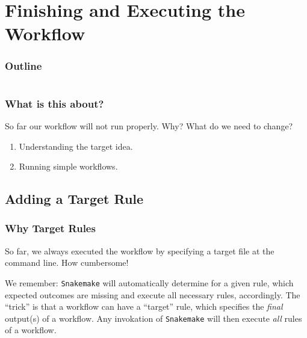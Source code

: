 \section{Finishing and Executing the Workflow}

\begin{frame}
    \frametitle{Outline}
    \begin{columns}[t]
        \begin{column}{.5\textwidth}
            \tableofcontents[sections={1-9},currentsection]
        \end{column}
        \begin{column}{.5\textwidth}
            \tableofcontents[sections={10-18},currentsection]
        \end{column}
    \end{columns}
\end{frame}

\begin{frame}
  \frametitle{What is this about?}
   \begin{question}[Questions]
      So far our workflow will not run properly. Why? What do we need to change?
   \end{question}
   \begin{docs}[Objectives]
   	  \begin{enumerate}
                      \item Understanding the target idea.
                      \item Running simple workflows.
      \end{enumerate}
    \end{docs}
\end{frame}

\subsection{Adding a Target Rule}

\begin{frame}
  \frametitle{Why Target Rules}
  So far, we always executed the workflow by specifying a target file at the command line. How cumbersome!\newline
  \begin{docs}
  	We remember: \texttt{Snakemake} will automatically determine for a given rule, which expected outcomes are missing and execute all necessary rules, accordingly.\newline\pause
        The ``trick'' is that a workflow can have a ``target'' rule, which specifies the \emph{final} output(s) of a workflow. Any invokation of \texttt{Snakemake} will then execute \emph{all} rules of a workflow.
   \end{docs}
\end{frame}

